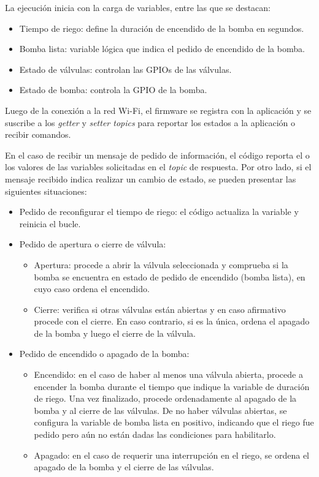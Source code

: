 La ejecución inicia con la carga de variables, entre las que se destacan:
\begin{itemize}
\item Tiempo de riego: define la duración de encendido de la bomba en segundos.
\item Bomba lista: variable lógica que indica el pedido de encendido de la bomba.
\item Estado de válvulas: controlan las GPIOs de las válvulas.
\item Estado de bomba: controla la GPIO de la bomba.
\end{itemize}

Luego de la conexión a la red Wi-Fi, el firmware se registra con la aplicación y se suscribe a los \textit{getter} y \textit{setter topics} para reportar los estados a la aplicación o recibir comandos.



En el caso de recibir un mensaje de pedido de información, el código reporta el o los valores de las variables solicitadas en el \textit{topic} de respuesta. Por otro lado, si el mensaje recibido indica realizar un cambio de estado, se pueden presentar las siguientes situaciones:
\pagebreak

\begin{itemize}
\item Pedido de reconfigurar el tiempo de riego: el código actualiza la variable y reinicia el bucle.

\item Pedido de apertura o cierre de válvula:
    \begin{itemize}
    \item Apertura: procede a abrir la válvula seleccionada y  comprueba si la bomba se encuentra en estado de pedido de encendido (bomba lista), en cuyo caso ordena el encendido.
    \item Cierre: verifica si otras válvulas están abiertas y en caso afirmativo procede con el cierre. En caso contrario, si es la única, ordena el apagado de la bomba y luego el cierre de la válvula.
    
    \end{itemize}

\item Pedido de encendido o apagado de la bomba:
    \begin{itemize}
    \item Encendido: en el caso de haber al menos una válvula abierta, procede a encender la bomba durante el tiempo que indique la variable de duración de riego. Una vez finalizado, procede ordenadamente al apagado de la bomba y al cierre de las válvulas. De no haber válvulas abiertas, se configura la variable de bomba lista en positivo, indicando que el riego fue pedido pero aún no están dadas las condiciones para habilitarlo.
    \item Apagado: en el caso de requerir una interrupción en el riego, se ordena el apagado de la bomba y el cierre de las válvulas.
    
    \end{itemize}



\end{itemize}




